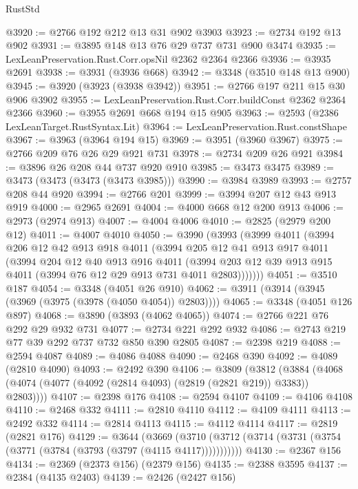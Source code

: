 \begin{lexlean}{RustStd}
\begin{coremodule}
@3920 := @2766 @192 @212 @13 @31 @902 @3903
@3923 := @2734 @192 @13 @902
@3931 := @3895 @148 @13 @76 @29 @737 @731 @900 @3474
@3935 := LexLeanPreservation.Rust.Corr.opsNil @2362 @2364 @2366
@3936 := @3935 @2691
@3938 := @3931 (@3936 @668)
@3942 := @3348 (@3510 @148 @13 @900)
@3945 := @3920 (@3923 (@3938 @3942))
@3951 := @2766 @197 @211 @15 @30 @906 @3902
@3955 := LexLeanPreservation.Rust.Corr.buildConst @2362 @2364 @2366
@3960 := @3955 @2691 @668 @194 @15 @905
@3963 := @2593 (@2386 LexLeanTarget.RustSyntax.Lit)
@3964 := LexLeanPreservation.Rust.constShape
@3967 := @3963 (@3964 @194 @15)
@3969 := @3951 (@3960 @3967)
@3975 := @2766 @209 @76 @26 @29 @921 @731
@3978 := @2734 @209 @26 @921
@3984 := @3896 @26 @208 @44 @737 @920 @910
@3985 := @3473 @3475
@3989 := @3473 (@3473 (@3473 (@3473 @3985)))
@3990 := @3984 @3989
@3993 := @2757 @208 @44 @920
@3994 := @2766 @201
@3999 := @3994 @207 @12 @43 @913 @919
@4000 := @2965 @2691
@4004 := @4000 @668 @12 @200 @913
@4006 := @2973 (@2974 @913)
@4007 := @4004 @4006
@4010 := @2825 (@2979 @200 @12)
@4011 := @4007 @4010
@4050 := @3990
    (@3993
      (@3999
        @4011
        (@3994
          @206
          @12
          @42
          @913
          @918
          @4011
          (@3994
            @205
            @12
            @41
            @913
            @917
            @4011
            (@3994
              @204
              @12
              @40
              @913
              @916
              @4011
              (@3994 @203 @12 @39 @913 @915 @4011 (@3994 @76 @12 @29 @913 @731 @4011 @2803)))))))
@4051 := @3510 @187
@4054 := @3348 (@4051 @26 @910)
@4062 := @3911 (@3914 (@3945 (@3969 (@3975 (@3978 (@4050 @4054)) @2803))))
@4065 := @3348 (@4051 @126 @897)
@4068 := @3890 (@3893 (@4062 @4065))
@4074 := @2766 @221 @76 @292 @29 @932 @731
@4077 := @2734 @221 @292 @932
@4086 := @2743 @219 @77 @39 @292 @737 @732 @850 @390 @2805
@4087 := @2398 @219
@4088 := @2594 @4087
@4089 := @4086 @4088
@4090 := @2468 @390
@4092 := @4089 (@2810 @4090)
@4093 := @2492 @390
@4106 := @3809
    (@3812 (@3884 (@4068 (@4074 (@4077 (@4092 (@2814 @4093) (@2819 (@2821 @219)) @3383)) @2803))))
@4107 := @2398 @176
@4108 := @2594 @4107
@4109 := @4106 @4108
@4110 := @2468 @332
@4111 := @2810 @4110
@4112 := @4109 @4111
@4113 := @2492 @332
@4114 := @2814 @4113
@4115 := @4112 @4114
@4117 := @2819 (@2821 @176)
@4129 := @3644
    (@3669 (@3710 (@3712 (@3714 (@3731 (@3754 (@3771 (@3784 (@3793 (@3797 (@4115 @4117)))))))))))
@4130 := @2367 @156
@4134 := @2369 (@2373 @156) (@2379 @156)
@4135 := @2388 @3595
@4137 := @2384 (@4135 @2403)
@4139 := @2426 (@2427 @156)

\end{coremodule}
\end{lexlean}
